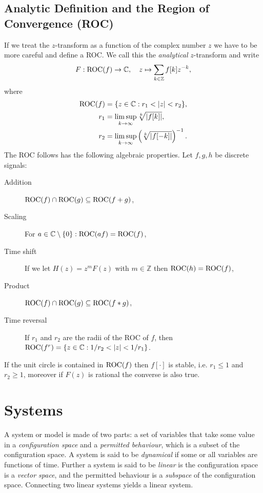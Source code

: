 \subsection{Analytic Definition and the Region of Convergence (ROC)}

If we treat the $z$-transform as a function of the complex number $z$ we have
to be more careful and define a ROC. We call this the \emph{analytical}
$z$-transform and write
\[
	F : \operatorname{ROC}(f) \to \mathbb{C}, \quad
	z \mapsto \sum_{k\in\mathbb{Z}} f[k]z^{-k},
\]
where
\begin{align*}
	\operatorname{ROC}(f) &= \{z \in \mathbb{C} : r_1 < |z| < r_2\}, \\
	r_1 &= \limsup_{k\to\infty} \sqrt[k]{|f[k]|}, \\ 
	r_2 &= \limsup_{k\to\infty} \left(\sqrt[k]{|f[-k]|}\right)^{-1}.
\end{align*}
The ROC follows has the following algebraic properties. Let $f,g,h$ be
discrete signals:
\begin{description}
	\item[Addition] $\operatorname{ROC}(f) \cap \operatorname{ROC}(g) \subseteq \operatorname{ROC}(f + g)$,
	\item[Scaling] For $a \in \mathbb{C} \setminus \{0\} : \operatorname{ROC}(af) = \operatorname{ROC}(f)$,
	\item[Time shift] If we let $H(z) = z^m F(z)$ with $m \in \mathbb{Z}$ then
		$\operatorname{ROC}(h) = \operatorname{ROC}(f)$,
	\item[Product] $\operatorname{ROC}(f) \cap \operatorname{ROC}(g) \subseteq \operatorname{ROC}(f * g)$,
	\item[Time reversal] If $r_1$ and $r_2$ are the radii of the ROC of $f$,
		then $\operatorname{ROC}(f^r) = \{ z \in\mathbb{C} : 1/r_2 < |z| < 1/r_1 \}$.
\end{description}
If the unit circle is contained in $\operatorname{ROC}(f)$ then $f[\cdot]$ is stable, i.e.
$r_1 \leq 1$ and $r_2 \geq 1$, moreover if $F(z)$ is rational the converse is
also true.

\section{Systems}

A system or model is made of two parts: a set of variables that take some
value in a \emph{configuration space} and a \emph{permitted behaviour}, which
is a subset of the configuration space. A system is said to be
\emph{dynamical} if some or all variables are functions of time. Further a
system is said to be \emph{linear} is the configuration space is a
\emph{vector space}, and the permitted behaviour is a \emph{subspace} of the
configuration space. Connecting two linear systems yields a linear system.

